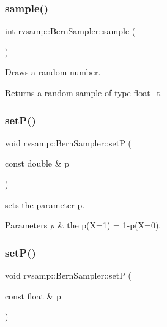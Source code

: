 \subsubsection{\texorpdfstring{sample()}{sample()}}
{\footnotesize\ttfamily int rvsamp\+::\+Bern\+Sampler\+::sample (\begin{DoxyParamCaption}{ }\end{DoxyParamCaption})}



Draws a random number. 

\begin{DoxyReturn}{Returns}
a random sample of type float\+\_\+t. 
\end{DoxyReturn}
\mbox{\label{classrvsamp_1_1BernSampler_ad6020e9f9f62a9ab32e64638cc29880b}} 
\subsubsection{\texorpdfstring{set\+P()}{setP()}\hspace{0.1cm}{\footnotesize\ttfamily [1/2]}}
{\footnotesize\ttfamily void rvsamp\+::\+Bern\+Sampler\+::setP (\begin{DoxyParamCaption}\item[{const double \&}]{p }\end{DoxyParamCaption})}



sets the parameter p. 


\begin{DoxyParams}{Parameters}
{\em p} & the p(X=1) = 1-\/p(X=0). \\
\hline
\end{DoxyParams}
\mbox{\label{classrvsamp_1_1BernSampler_a115d668c1eb9e13a98c5d5f265a26ba2}} 
\subsubsection{\texorpdfstring{set\+P()}{setP()}\hspace{0.1cm}{\footnotesize\ttfamily [2/2]}}
{\footnotesize\ttfamily void rvsamp\+::\+Bern\+Sampler\+::setP (\begin{DoxyParamCaption}\item[{const float \&}]{p }\end{DoxyParamCaption})}



